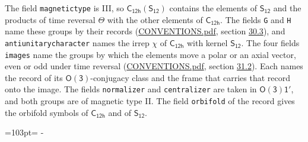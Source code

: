 \documentclass[10pt,a4paper]{article}
\newcommand{\needspace}[1]{\par\penalty-100\begingroup\dimen0=#1\relax\dimen2=\pagegoal
  \advance\dimen2-\pagetotal\ifdim\dimen0>\dimen2\relax\ifdim\dimen2>0pt\vfil\break\fi\fi
  \endgroup}
\numberwithin{equation}{section}
\newcommand{\grp}[1]{\mathsf{#1}}
\begin{document}
The field \texttt{magnetictype} is III, so $\grp{C_{12h}}(\grp{S_{12}})$ contains the elements of $\grp{S_{12}}$ and the products of time reversal $\varTheta$ with the other elements of $\grp{C_{12h}}$. The fields \texttt{G} and \texttt{H} name these groups by their records (\href{../../CONVENTIONS.pdf}{CONVENTIONS.pdf}, section \href{../../CONVENTIONS.pdf\#conv.30.3}{30.3}), and \texttt{antiunitarycharacter} names the irrep $\chi$ of $\grp{C_{12h}}$ with kernel $\grp{S_{12}}$. The four fields \texttt{images} name the groups by which the elements move a polar or an axial vector, even or odd under time reversal (\href{../../CONVENTIONS.pdf}{CONVENTIONS.pdf}, section \href{../../CONVENTIONS.pdf\#conv.31.2}{31.2}). Each names the record of its $\grp{O(3)}$-conjugacy class and the frame that carries that record onto the image. The fields \texttt{normalizer} and \texttt{centralizer} are taken in $\grp{O(3)1'}$, and both groups are of magnetic type II. The field \texttt{orbifold} of the record gives the orbifold symbols of $\grp{C_{12h}}$ and of $\grp{S_{12}}$.
\needspace{103pt}
\end{document}
